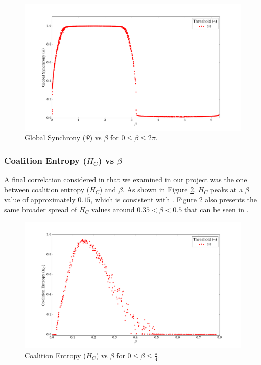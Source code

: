 \documentclass[a4paper,11pt]{article}
\begin{document}
\begin{figure}[H]
\begin{center}
\includegraphics[scale = 0.35]{figures/psi_vs_beta_ext}
\caption{
	Global Synchrony ($\Psi$) vs $\beta$ for $0 \leq \beta \leq 2\pi$.
	\label{fig:psi-vs-beta-ext}
}
\end{center}
\end{figure}

\subsubsection{Coalition Entropy ($H_C$) vs $\beta$}
\label{sec:app:osc:res:hc-v-beta}

A final correlation considered in \cite{Shanahan2010} that we examined in our project was the one between coalition entropy ($H_C$) and $\beta$. As shown in Figure \ref{fig:hc-vs-beta-orig}, $H_C$ peaks at a $\beta$ value of approximately $0.15$, which is consistent with \cite{Shanahan2010}. Figure \ref{fig:hc-vs-beta-orig} also presents the same broader spread of $H_C$ values around $0.35 < \beta < 0.5$ that can be seen in \cite{Shanahan2010}.

\begin{figure}[H]
\begin{center}
\includegraphics[scale = 0.35]{figures/hc_vs_beta_orig}
\caption{
	Coalition Entropy ($H_C$) vs $\beta$ for $0 \leq \beta \leq \frac{\pi}{4}$.
	\label{fig:hc-vs-beta-orig}
}
\end{center}
\end{figure}
\end{document}
